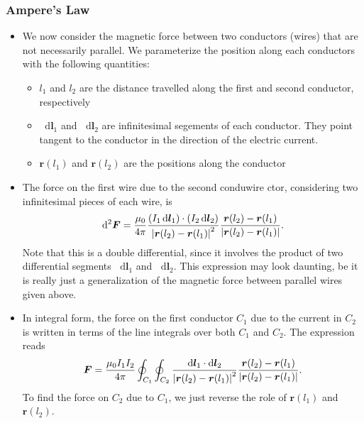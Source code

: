 \documentclass[11pt, a4paper]{article}
\newcommand{\diff}{\mathop{}\!\mathrm{d}} %
\renewcommand{\vec}[1]{\bm{#1}} %
\renewcommand{\r}{\vec{r}}
\newcommand{\mm}{\mu_{0}}  %
\begin{document}
\subsubsection{Ampere's Law}
\begin{itemize}
	\item We now consider the magnetic force between two conductors (wires) that are not necessarily parallel. We parameterize the position along each conductors with the following quantities:
    \begin{itemize}
        \item $ l_{1} $ and $ l_{2} $ are the distance travelled along the first and second conductor, respectively

        \item $ \diff \vec{l}_{1} $ and $ \diff \vec{l}_{2} $ are infinitesimal segements of each conductor. They point tangent to the conductor in the direction of the electric current.

        \item $ \r(l_{1})  $ and $ \r(l_{2})  $ are the positions along the conductor
    \end{itemize}
    
	\item The force on the first wire due to the second conduwire ctor, considering two infinitesimal pieces of each wire, is
	\begin{equation*}
		\diff^{2}\vec{F} = \frac{\mm}{4\pi}\frac{(I_{1}\diff \vec{l}_{1}) \cdot (I_{2}\diff \vec{l}_{2})}{\abs{\r(l_{2}) - \r(l_{1})}^{2}}\frac{\r(l_{2}) - \r(l_{1})}{\abs{\r(l_{2}) - \r(l_{1})}}.
	\end{equation*}
    Note that this is a double differential, since it involves the product of two differential segments $ \diff \vec{l}_{1} $ and $ \diff \vec{l}_{2} $. This expression may look daunting, be it is really just a generalization of the magnetic force between parallel wires given above.
	
	\item In integral form, the force on the first conductor $ C_{1} $ due to the current in $ C_{2} $ is written in terms of the line integrals over both $ C_{1} $ and $ C_{2} $. The expression reads
	\begin{equation*}
		\vec{F} = \frac{\mm I_{1}I_{2}}{4\pi}\oint_{C_{1}}\oint_{C_{2}}\frac{\diff \vec{l}_{1} \cdot \diff \vec{l}_{2}}{\abs{\r(l_{2}) - \r(l_{1})}^{2}} \frac{\r(l_{2}) - \r(l_{1})}{\abs{\r(l_{2}) - \r(l_{1})}}.
	\end{equation*}
	To find the force on $ C_{2} $ due to $ C_{1} $, we just reverse the role of $ \r(l_{1}) $ and $ \r(l_{2}) $.
	

\end{itemize}
\end{document}
